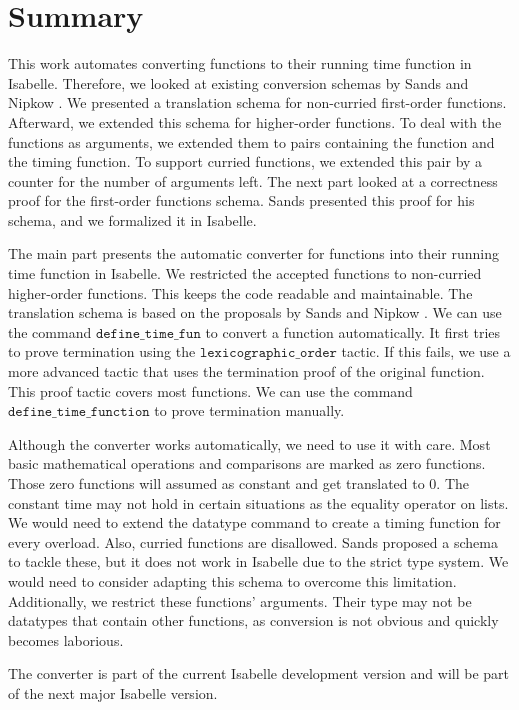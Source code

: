 
\chapter{Summary}\label{chapter:summary}
This work automates converting functions to their running time function in Isabelle.
Therefore, we looked at existing conversion schemas by Sands \parencite{sands} and Nipkow \parencite{fds}.
We presented a translation schema for non-curried first-order functions.
Afterward, we extended this schema for higher-order functions.
To deal with the functions as arguments, we extended them to pairs containing the function and the timing function.
To support curried functions, we extended this pair by a counter for the number of arguments left.
The next part looked at a correctness proof for the first-order functions schema.
Sands presented this proof for his schema, and we formalized it in Isabelle.

The main part presents the automatic converter for functions into their running time function in Isabelle.
We restricted the accepted functions to non-curried higher-order functions.
This keeps the code readable and maintainable.
The translation schema is based on the proposals by Sands \parencite{sands} and Nipkow \parencite{fds}.
We can use the command $\texttt{define\_time\_fun}$ to convert a function automatically.
It first tries to prove termination using the $\texttt{lexicographic\_order}$ tactic.
If this fails, we use a more advanced tactic that uses the termination proof of the original function.
This proof tactic covers most functions.
We can use the command $\texttt{define\_time\_function}$ to prove termination manually.

Although the converter works automatically, we need to use it with care.
Most basic mathematical operations and comparisons are marked as zero functions.
Those zero functions will assumed as constant and get translated to $0$.
The constant time may not hold in certain situations as the equality operator on lists.
We would need to extend the datatype command to create a timing function for every overload.
Also, curried functions are disallowed.
Sands proposed a schema to tackle these, but it does not work in Isabelle due to the strict type system.
We would need to consider adapting this schema to overcome this limitation.
Additionally, we restrict these functions' arguments.
Their type may not be datatypes that contain other functions, as conversion is not obvious and quickly becomes laborious.

The converter is part of the current Isabelle development version and will be part of the next major Isabelle version.
